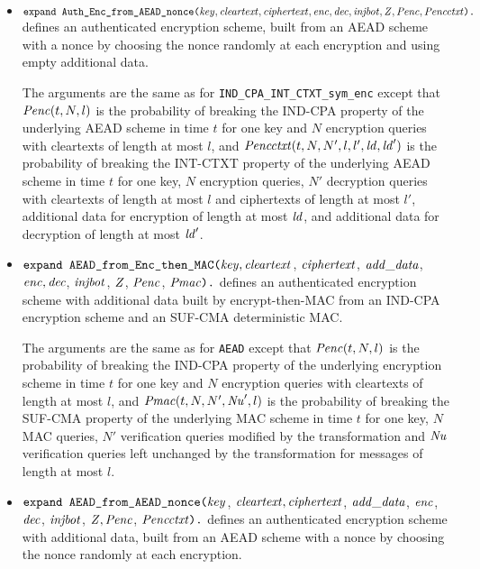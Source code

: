 \documentclass{article}
\begin{document}
\begin{itemize}
 \item 
   $\texttt{expand\ Auth\_Enc\_from\_AEAD\_nonce(}\vn{key}, \vn{cleartext},
   \vn{ciphertext}, \vn{enc}, \vn{dec}, \vn{injbot}, \vn{Z},
   \vn{Penc}, \vn{Pencctxt}\texttt{).}$ defines an authenticated
   encryption scheme, built from an AEAD scheme with a nonce
   by choosing the nonce randomly at each encryption and
   using empty additional data.

   The arguments are the same as for
   \texttt{IND\_CPA\_INT\_CTXT\_sym\_enc} except that $\mathit{Penc}(t, N,
   l)$ is the probability of breaking the IND-CPA property of the
   underlying AEAD scheme in time $t$ for one key and $N$ encryption
   queries with cleartexts of length at most $l$, and
   $\mathit{Pencctxt}(t, N, N', l, l', \mathit{ld}, \mathit{ld}')$ is the
   probability of breaking the INT-CTXT property of the underlying
   AEAD scheme in time $t$ for one key, $N$ encryption queries, $N'$
   decryption queries with cleartexts of length at most $l$ and
   ciphertexts of length at most $l'$, additional data for encryption
   of length at most $\mathit{ld}$, and additional data for decryption of
   length at most $\mathit{ld}'$.

\item $\texttt{expand AEAD\_from\_Enc\_then\_MAC(}\mathit{key},
  \mathit{cleartext}$, $\mathit{ciphertext}$, $\mathit{add\_data}$, $\mathit{enc},
  \mathit{dec}$, $\mathit{injbot}$, $\mathit{Z}$, $\mathit{Penc}$, $\mathit{Pmac}\texttt{).}$ defines an
authenticated encryption scheme with additional data built by encrypt-then-MAC from an IND-CPA encryption scheme and an SUF-CMA deterministic MAC.

The arguments are the same as for \texttt{AEAD} except that $\mathit{Penc}(t, N, l)$ is the probability of breaking the IND-CPA
  property of the underlying encryption scheme in time $t$ for one key and $N$ encryption queries with
  cleartexts of length at most $l$, and
  $\mathit{Pmac}(t, N, N', \mathit{Nu}', l)$ is the probability of breaking the SUF-CMA
   property of the underlying MAC scheme in time $t$ for one key, $N$ MAC queries, $N'$ verification
   queries modified by the transformation and $\mathit{Nu}$ verification
   queries left unchanged by the transformation for messages of length at most $l$.

\item 
   $\texttt{expand\ AEAD\_from\_AEAD\_nonce(}\vn{key}$, $\mathit{cleartext},
   \mathit{ciphertext}$, $\mathit{add\_data}$, $\mathit{enc}$, $\mathit{dec}$, $\mathit{injbot}$, $\mathit{Z},
   \mathit{Penc}$, $\mathit{Pencctxt}\texttt{).}$ defines an authenticated
   encryption scheme with additional data, built from an AEAD scheme with a nonce
   by choosing the nonce randomly at each encryption.


\end{itemize}
\end{document}
